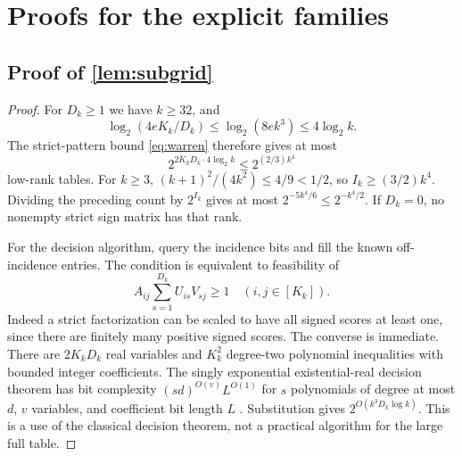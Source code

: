 \section{Proofs for the explicit families}\label{app:proofs-D}

\subsection[Proof of result subgrid]{Proof of \cref{lem:subgrid}}\label{proof:subgrid}
\begin{proof}
For $D_k\ge1$ we have $k\ge32$, and
\[
 \log_2(4eK_k/D_k)\le\log_2(8e k^3)\le4\log_2k.
\]
The strict-pattern bound \eqref{eq:warren} therefore gives at most
\[
 2^{2K_kD_k\cdot4\log_2k}\le2^{(2/3)k^4}
\]
low-rank tables. For $k\ge3$, $(k+1)^2/(4k^2)\le4/9<1/2$, so $I_k\ge(3/2)k^4$. Dividing the preceding count by $2^{I_k}$ gives at most $2^{-5k^4/6}\le2^{-k^4/2}$. If $D_k=0$, no nonempty strict sign matrix has that rank.

For the decision algorithm, query the incidence bits and fill the known off-incidence entries. The condition is equivalent to feasibility of
\[
 A_{ij}\sum_{s=1}^{D_k}U_{is}V_{sj}\ge1\quad(i,j\in[K_k]).
\]
Indeed a strict factorization can be scaled to have all signed scores at least one, since there are finitely many positive signed scores. The converse is immediate. There are $2K_kD_k$ real variables and $K_k^2$ degree-two polynomial inequalities with bounded integer coefficients. The singly exponential existential-real decision theorem has bit complexity $(sd)^{O(v)}L^{O(1)}$ for $s$ polynomials of degree at most $d$, $v$ variables, and coefficient bit length $L$ \citep{Renegar92,Vorobjov21}. Substitution gives $2^{O(k^3D_k\log k)}$. This is a use of the classical decision theorem, not a practical algorithm for the large full table.
\end{proof}

